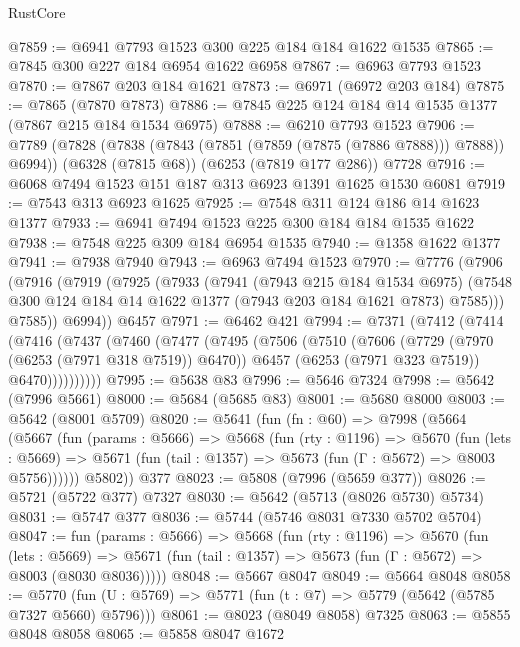 \begin{lexlean}{RustCore}
\begin{coremodule}
@7859 := @6941 @7793 @1523 @300 @225 @184 @184 @1622 @1535
@7865 := @7845 @300 @227 @184 @6954 @1622 @6958
@7867 := @6963 @7793 @1523
@7870 := @7867 @203 @184 @1621
@7873 := @6971 (@6972 @203 @184)
@7875 := @7865 (@7870 @7873)
@7886 := @7845 @225 @124 @184 @14 @1535 @1377 (@7867 @215 @184 @1534 @6975)
@7888 := @6210 @7793 @1523
@7906 := @7789
    (@7828 (@7838 (@7843 (@7851 (@7859 (@7875 (@7886 @7888))) @7888)) @6994))
    (@6328 (@7815 @68))
    (@6253 (@7819 @177 @286))
    @7728
@7916 := @6068 @7494 @1523 @151 @187 @313 @6923 @1391 @1625 @1530 @6081
@7919 := @7543 @313 @6923 @1625
@7925 := @7548 @311 @124 @186 @14 @1623 @1377
@7933 := @6941 @7494 @1523 @225 @300 @184 @184 @1535 @1622
@7938 := @7548 @225 @309 @184 @6954 @1535
@7940 := @1358 @1622 @1377
@7941 := @7938 @7940
@7943 := @6963 @7494 @1523
@7970 := @7776
    (@7906
      (@7916
        (@7919
          (@7925
            (@7933
              (@7941
                (@7943 @215 @184 @1534 @6975)
                (@7548 @300 @124 @184 @14 @1622 @1377 (@7943 @203 @184 @1621 @7873) @7585)))
            @7585))
        @6994))
    @6457
@7971 := @6462 @421
@7994 := @7371
    (@7412
      (@7414
        (@7416
          (@7437
            (@7460
              (@7477
                (@7495
                  (@7506
                    (@7510
                      (@7606
                        (@7729 (@7970 (@6253 (@7971 @318 @7519)) @6470))
                        @6457
                        (@6253 (@7971 @323 @7519))
                        @6470))))))))))
@7995 := @5638 @83
@7996 := @5646 @7324
@7998 := @5642 (@7996 @5661)
@8000 := @5684 (@5685 @83)
@8001 := @5680 @8000
@8003 := @5642 (@8001 @5709)
@8020 := @5641
    (fun (fn : @60) =>
    @7998
      (@5664
        (@5667
          (fun (params : @5666) =>
          @5668
            (fun (rty : @1196) =>
            @5670
              (fun (lets : @5669) =>
              @5671 (fun (tail : @1357) => @5673 (fun (Γ : @5672) => @8003 @5756))))))
        @5802))
    @377
@8023 := @5808 (@7996 (@5659 @377))
@8026 := @5721 (@5722 @377) @7327
@8030 := @5642 (@5713 (@8026 @5730) @5734)
@8031 := @5747 @377
@8036 := @5744 (@5746 @8031 @7330 @5702 @5704)
@8047 := fun (params : @5666) =>
  @5668
    (fun (rty : @1196) =>
    @5670
      (fun (lets : @5669) =>
      @5671 (fun (tail : @1357) => @5673 (fun (Γ : @5672) => @8003 (@8030 @8036)))))
@8048 := @5667 @8047
@8049 := @5664 @8048
@8058 := @5770 (fun (U : @5769) => @5771 (fun (t : @7) => @5779 (@5642 (@5785 @7327 @5660) @5796)))
@8061 := @8023 (@8049 @8058) @7325
@8063 := @5855 @8048 @8058
@8065 := @5858 @8047 @1672

\end{coremodule}
\end{lexlean}

